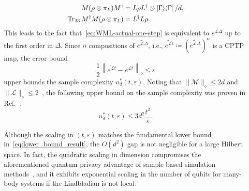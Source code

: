\documentclass[superscriptaddress,amsmath,amssymb,aps,pra,letterpaper,tightenlines,notitlepages,12pt]{revtex4-2}
\begin{document}
\begin{align}
M(\rho\otimes\pi_L)M^\dagger & =L\rho L^\dagger\otimes\ket{\Gamma}\!\bra{\Gamma}/d, \label{eq:1st-order-1}\\
\operatorname{Tr}_{23}M^\dagger M(\rho\otimes\pi_L) & =L^\dagger L\rho.
\label{eq:1st-order-2}
\end{align}
This leads to the fact that~\eqref{eq:WML-actual-one-step} is equivalent to $e^{\mathcal{L} \Delta}$ up to the first order in $\Delta$. Since $n$ compositions of $\widetilde{e^{\mathcal{L}\Delta}}$, i.e., $ \widetilde{e^{\mathcal{L}t}}\coloneq\left(\widetilde{e^{\mathcal{L}\Delta}}\right)^n$ is a CPTP map, the error bound
\begin{equation}
    \frac{1}{2}\left\|\widetilde{e^{\mathcal{L}t}}-e^{\mathcal{L}t}\right\|_\diamond\leq\varepsilon
\end{equation}
upper bounds the sample complexity $n_{d}^{\ast}(t,\varepsilon)$.
Noting that $\|\mathcal{M}\|_\diamond\leq2d$ and $\|\mathcal{L}\|_\diamond\leq2$~\cite[Appendix D]{go2025SamplebasedHamiltonianLindbladian}, the following upper bound on the sample complexity was proven in Ref.~\cite[Theorem 9]{go2025SamplebasedHamiltonianLindbladian}:
\begin{equation}
    n_{d}^{\ast}(t,\varepsilon)\leq 3d^2\frac{t^2}{\varepsilon}. \label{eq: old-upper}
\end{equation}

Although the scaling in $(t,\varepsilon)$ matches the fundamental lower bound in~\eqref{eq:lower_bound_result}, the $O(d^2)$ gap is not negligible for a large Hilbert space. In fact, the quadratic scaling in dimension compromises the aforementioned quantum privacy advantage of sample-based simulation methods~\cite{aaronson2009QuantumCopyProtectionQuantum, kimmel2017HamiltonianSimulationOptimal}, and it exhibits exponential scaling in the number of qubits for many-body systems if the Lindbladian is not local.
\end{document}
